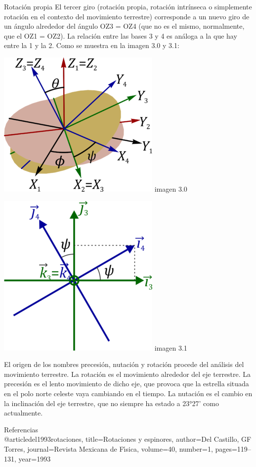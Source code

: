 \documentclass[10pt,a4paper]{article}
\begin{document}
\Large  Rotación propia
El tercer giro (rotación propia, rotación intrínseca o simplemente rotación en el contexto del movimiento terrestre) corresponde a un nuevo giro de un ángulo  alrededor del ángulo OZ3 = OZ4 (que no es el mismo, normalmente, que el OZ1 = OZ2). La relación entre las bases 3 y 4 es análoga a la que hay entre la 1 y la 2. Como se muestra en la imagen 3.0 y 3.1:
 \begin{center}
\includegraphics[scale=3.1]{imagenes/x.png} imagen 3.0
\end{center}
\begin{center}
\includegraphics[scale=3.]{imagenes/j.png} imagen 3.1

\Large El origen de los nombres precesión, nutación y rotación procede del análisis del movimiento terrestre. La rotación es el movimiento alrededor del eje terrestre. La precesión es el lento movimiento de dicho eje, que provoca que la estrella situada en el polo norte celeste vaya cambiando en el tiempo. La nutación es el cambio en la inclinación del eje terrestre, que no siempre ha estado a 23°27' como actualmente.
\end{center}

\hspace{6cm}

\vspace{7cm}
{\Huge Referencias} \\
@article{del1993rotaciones,
  title={Rotaciones y espinores},
  author={Del Castillo, GF Torres},
  journal={Revista Mexicana de F{\'\i}sica},
  volume={40},
  number={1},
  pages={119--131},
  year={1993}
}
\end{document}
